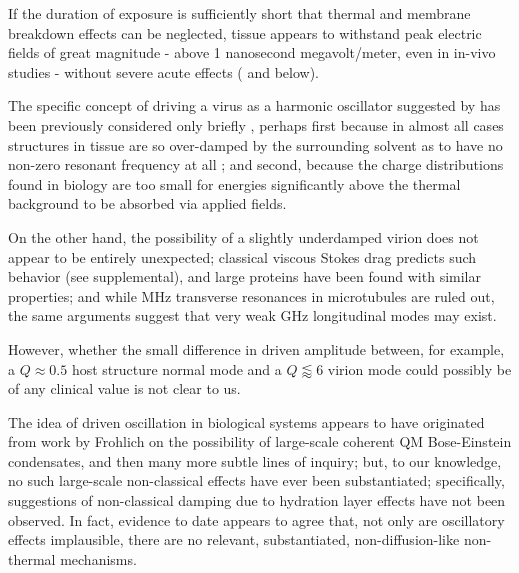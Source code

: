 \documentclass[paper.tex]{subfiles}
\begin{document}
\begin{multicols}{1}
If the duration of exposure is sufficiently short that thermal and membrane breakdown effects can be neglected, tissue appears to withstand peak electric fields of great magnitude - above 1 nanosecond megavolt/meter, even in in-vivo studies - without severe acute effects (\cite{Repeated2020}\cite{Review2011}\cite{DNA2004} and below).

The specific concept of driving a virus as a harmonic oscillator suggested by \cite{Efficient2015} has been previously considered only briefly \cite{MECHANICAL1968}\cite{Comment2004}\cite{Vibrational2009}\cite{Maximum2010}\cite{Effects1951}, perhaps first because in almost all cases structures in tissue are so over-damped by the surrounding solvent\cite{Vibrational2002}\cite{Biological2002}\cite{Biophysics2000}\cite{Viscous2000} as to have no non-zero resonant frequency at all \cite{dielectric1996}\cite{gabriel1996compilation}; and second, because the charge distributions found in biology are too small for energies significantly above the thermal background to be absorbed via applied fields. 

On the other hand, the possibility of a slightly underdamped virion does not appear to be entirely unexpected; classical viscous Stokes drag predicts such behavior\cite{nature1986} (see supplemental), and large proteins have been found with similar properties\cite{Microwave1994}; and while MHz transverse resonances in microtubules are ruled out\cite{Viscous2000}, the same arguments suggest that very weak GHz longitudinal modes may exist.

However, whether the small difference in driven amplitude between, for example, a $Q\approx0.5$ host structure normal mode and a $Q\lessapprox6$ virion mode could possibly be of any clinical value is not clear to us.

%

The idea of driven oscillation in biological systems appears to have originated from work by Frohlich\cite{Longrange1968}\cite{Evidence1983}\cite{Biological1980}\cite{Coherence1983} on the possibility of large-scale coherent QM Bose-Einstein condensates, and then many more subtle lines of inquiry\cite{Mechanisms1992}\cite{mechanisms1981}; but, to our knowledge, no such large-scale non-classical effects have ever been substantiated; specifically, suggestions of non-classical damping due to hydration layer effects have not been observed. In fact, evidence to date\cite{Exposure2009}\cite{ICNIRP2020}\cite{C95} appears to agree that, not only are oscillatory effects implausible, there are no relevant, substantiated, non-diffusion-like non-thermal mechanisms. 


\end{multicols}
\end{document}
